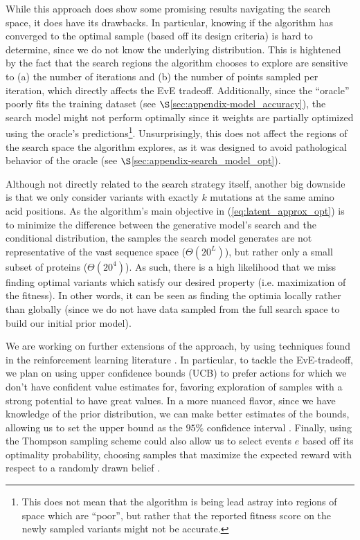 \documentclass{article}
\begin{document}
While this approach does show some promising results navigating the search
space, it does have its drawbacks. In particular, knowing if the algorithm has
converged to the optimal sample (based off its design criteria) is hard to
determine, since we do not know the underlying distribution. This is hightened
by the fact that the search regions the algorithm chooses to explore are
sensitive to (a) the number of iterations and (b) the number of points sampled
per iteration, which directly affects the EvE tradeoff. Additionally, since the
``oracle'' poorly fits the training dataset (see
$\S$\ref{sec:appendix-model_accuracy}), the search model might not perform
optimally since it weights are partially optimized using the oracle's
predictions\footnote{This does not mean that the algorithm is being lead astray
into regions of space which are ``poor'', but rather that the reported fitness
score on the newly sampled variants might not be accurate.}. Unsurprisingly,
this does not affect the regions of the search space the algorithm explores, as
it was designed to avoid pathological behavior of the oracle (see
$\S$\ref{sec:appendix-search_model_opt}).

Although not directly related to the search strategy itself, another big
downside is that we only consider variants with exactly $k$ mutations at the
same amino acid positions. As the algorithm's main objective in
(\ref{eq:latent_approx_opt}) is to minimize the difference between the
generative model's search and the conditional distribution, the samples the
search model generates are not representative of the vast sequence space
($\Theta(20^L)$), but rather only a small subset of proteins ($\Theta(20^4)$).
As such, there is a high likelihood that we miss finding optimal variants which
satisfy our desired property (i.e. maximization of the fitness). In other words,
it can be seen as finding the optimia locally rather than globally (since we do
not have data sampled from the full search space to build our initial prior
model).

We are working on further extensions of the approach, by using techniques found
in the reinforcement learning literature \cite{koulouriotis2008reinforcement,
kuleshov2014algorithms}. In particular, to tackle the EvE-tradeoff, we plan on
using upper confidence bounds (UCB) \cite{auer2010ucb} to prefer actions for
which we don't have confident value estimates for, favoring exploration of
samples with a strong potential to have great values. In a more nuanced flavor,
since we have knowledge of the prior distribution, we can make better estimates
of the bounds, allowing us to set the upper bound as the $95\%$ confidence
interval \cite{kaufmann2012bayesian}. Finally, using the Thompson sampling
scheme could also allow us to select events $e$ based off its optimality
probability, choosing samples that maximize the expected reward with respect to
a randomly drawn belief \cite{agrawal2012analysis}.
\end{document}

